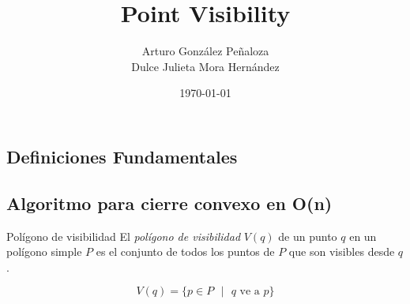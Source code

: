 \documentclass[aspectratio=169,xcolor=dvipsnames, t]{beamer}
\title[short title]{Point Visibility} %
\author{Arturo González Peñaloza\\ Dulce Julieta Mora Hernández}
\institute[Short title]{
  Universidad Nacional Autónoma de México
}
\date{\today} %
\let\oldsection\section
\renewcommand{\section}[2][\relax]{%
  \ifx#1\relax
    \oldsection{#2}%
  \else
    \oldsection[#1]{#2}%
  \fi%
  \label{sec:\thesection}%
}
\begin{document}
\maketitlepage
\begin{frame}[t]
  \tableofcontents
\end{frame}


\subsection{Definiciones Fundamentales}
\subsection{Algoritmo para cierre convexo en O(n)}


\begin{frame}{Polígono de visibilidad}
    El \textit{polígono de visibilidad} $V(q)$ de un punto $q$ en un polígono simple $P$ es el conjunto de todos los puntos de $P$ que son visibles desde $q$.
    \begin{center}
        \begin{equation*}
             V(q) = \{ p \in P \text{ } | \text{ } q \text{ ve a } p \}
        \end{equation*}
    \end{center}
\end{frame}
\end{document}

